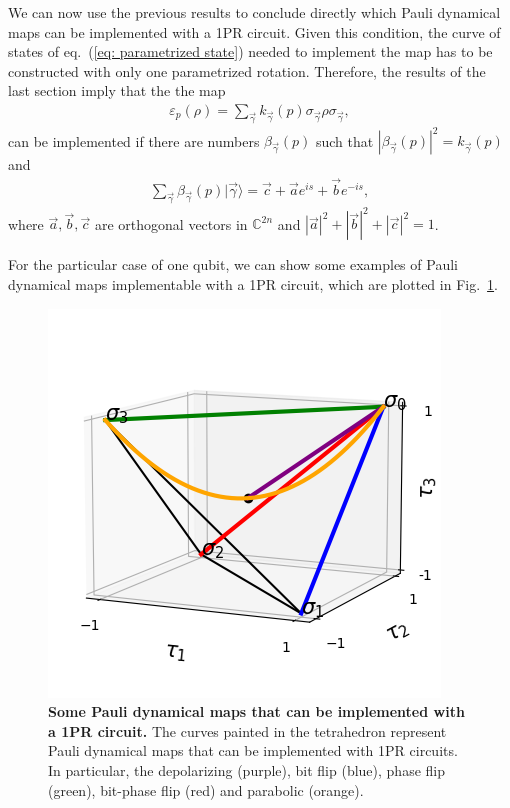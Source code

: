 \documentclass[10pt,letterpaper]{article} %
\newcommand{\fref}[1]{Fig.~\ref{#1}}
\newcommand{\eref}[1]{eq.~(\ref{#1})}
\begin{document}
We can now use the previous results to conclude directly which Pauli dynamical maps
can be implemented with a 1PR circuit.
Given this condition, the curve of states of \eref{eq: parametrized state}  needed 
to implement the map
has to be constructed with only one parametrized rotation. 
Therefore, the results of the last section imply that the the map
\begin{eqnarray}
\varepsilon_p(\rho) = \sum_{\vec{\gamma}} k_{\vec{\gamma}}(p) \sigma_{\vec{\gamma}} \rho \sigma_{\vec{\gamma}},
\end{eqnarray}
can be implemented  if there are numbers $\beta_{\vec{\gamma}}(p)$ such that $|\beta_{\vec{\gamma}}(p)|^2 = k_{\vec{\gamma}}(p)$ and
\begin{eqnarray}
\label{eq:vec}
\sum_{\vec{\gamma}} \beta_{\vec{\gamma}}(p) |\vec{\gamma}\rangle = \vec{c} + \vec{a} e^{is} + \vec{b} e^{-is},
\end{eqnarray}
where $\vec{a},\vec{b},\vec{c}$ are orthogonal vectors in $\mathbb{C}^{2n}$ 
and $|\vec{a}|^2+  |\vec{b}|^2 + |\vec{c}|^2= 1$.

For the particular case of one qubit,
we can show some examples of Pauli dynamical maps
implementable with a 1PR circuit, which are plotted
in \fref{fig:curves}.


\begin{figure} %
\centering
\includegraphics{images/curvas.png}
\caption{{\bf Some Pauli dynamical maps that can be implemented with a 1PR circuit.}
The curves painted in the tetrahedron
represent Pauli dynamical maps that can be implemented with 1PR circuits.
In particular, the depolarizing (purple), bit flip (blue),
phase flip (green), bit-phase flip (red)
and parabolic (orange). }
\label{fig:curves}
\end{figure} %
\end{document}
